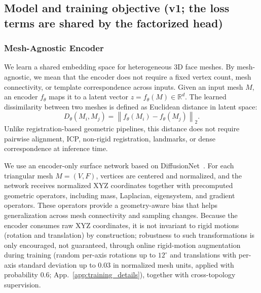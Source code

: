 
\subsection{Model and training objective (v1; the loss terms are shared by the factorized head)}
\label{sec:legacy_objective}
\subsubsection{Mesh-Agnostic Encoder}
\label{sec:encoder}
We learn a shared embedding space for heterogeneous 3D face meshes. By mesh-agnostic, we mean that the encoder does not require a fixed vertex count, mesh connectivity, or template correspondence across inputs. Given an input mesh $M$, an encoder $f_\theta$ maps it to a latent vector $z=f_\theta(M)\in\mathbb{R}^d$. The learned dissimilarity between two meshes is defined as Euclidean distance in latent space:
\begin{equation}
D_{\theta}(M_i,M_j)
=
\left\|
f_{\theta}(M_i)-f_{\theta}(M_j)
\right\|_2 .
\end{equation}
Unlike registration-based geometric pipelines, this distance does not require pairwise alignment, ICP, non-rigid registration, landmarks, or dense correspondence at inference time.

We use an encoder-only surface network based on DiffusionNet~\cite{diffusionet}. 
For each triangular mesh $M=(V,F)$, vertices are centered and normalized, and the network receives normalized XYZ coordinates together with precomputed geometric operators, including mass, Laplacian, eigensystem, and gradient operators. These operators provide a geometry-aware bias that helps generalization across mesh connectivity and sampling changes. Because the encoder consumes raw XYZ coordinates, it is not invariant to rigid motions (rotation and translation) by construction; robustness to such transformations is only encouraged, not guaranteed, through online rigid-motion augmentation during training (random per-axis rotations up to $12^\circ$ and translations with per-axis standard deviation up to $0.03$ in normalized mesh units, applied with probability $0.6$; App.~\ref{app:training_details}), together with cross-topology supervision.

